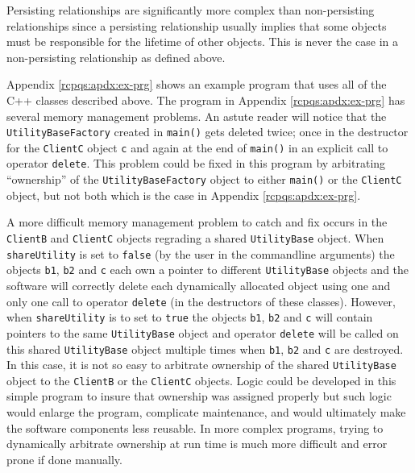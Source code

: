 \documentclass[pdf,ps2pdf,11pt]{SANDreport}
\begin{document}
Persisting relationships are significantly more complex than
non-persisting relationships since a persisting relationship usually
implies that some objects must be responsible for the lifetime of
other objects.  This is never the case in a non-persisting relationship as
defined above.

Appendix {}\ref{rcpqs:apdx:ex-prg} shows an example program that uses
all of the C++ classes described above.  The program in Appendix
{}\ref{rcpqs:apdx:ex-prg} has several memory management problems. An
astute reader will notice that the {}\texttt{Utility\-Base\-Factory}
created in {}\texttt{main()} gets deleted twice; once in the
destructor for the {}\texttt{ClientC} object {}\texttt{c} and again at
the end of {}\texttt{main()} in an explicit call to operator
{}\texttt{delete}.  This problem could be fixed in this program by
arbitrating ``ownership'' of the {}\texttt{Utility\-Base\-Factory}
object to either {}\texttt{main()} or the {}\texttt{ClientC} object,
but not both which is the case in Appendix {}\ref{rcpqs:apdx:ex-prg}.

A more difficult memory management problem to catch and fix occurs in
the {}\texttt{ClientB} and {}\texttt{ClientC} objects regrading a
shared {}\texttt{Utility\-Base} object.  When {}\texttt{shareUtility}
is set to {}\texttt{false} (by the user in the commandline arguments)
the objects {}\texttt{b1}, {}\texttt{b2} and {}\texttt{c} each own a
pointer to different {}\texttt{Utility\-Base} objects and the software
will correctly delete each dynamically allocated object using one and
only one call to operator {}\texttt{delete} (in the destructors of
these classes).  However, when {}\texttt{shareUtility} is to set to
{}\texttt{true} the objects {}\texttt{b1}, {}\texttt{b2} and
{}\texttt{c} will contain pointers to the same
{}\texttt{Utility\-Base} object and operator {}\texttt{delete} will be
called on this shared {}\texttt{Utility\-Base} object multiple times
when {}\texttt{b1}, {}\texttt{b2} and {}\texttt{c} are destroyed.  In
this case, it is not so easy to arbitrate ownership of the shared
{}\texttt{Utility\-Base} object to the {}\texttt{ClientB} or the
{}\texttt{ClientC} objects.  Logic could be developed in this simple
program to insure that ownership was assigned properly but such logic
would enlarge the program, complicate maintenance, and would
ultimately make the software components less reusable.  In more
complex programs, trying to dynamically arbitrate ownership at run
time is much more difficult and error prone if done manually.
\end{document}
